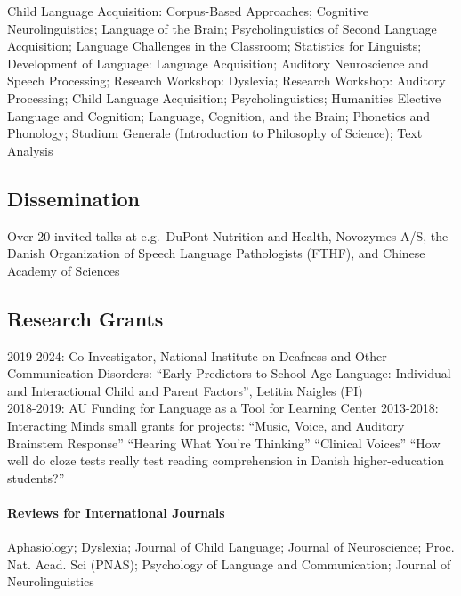 \documentclass[]{article}
\let\oldparagraph\paragraph
\renewcommand{\paragraph}[1]{\oldparagraph{#1}\mbox{}}
\begin{document}
Child Language Acquisition: Corpus-Based Approaches; Cognitive
Neurolinguistics; Language of the Brain; Psycholinguistics of Second
Language Acquisition; Language Challenges in the Classroom; Statistics
for Linguists; Development of Language: Language Acquisition; Auditory
Neuroscience and Speech Processing; Research Workshop: Dyslexia;
Research Workshop: Auditory Processing; Child Language Acquisition;
Psycholinguistics; Humanities Elective Language and Cognition; Language,
Cognition, and the Brain; Phonetics and Phonology; Studium Generale
(Introduction to Philosophy of Science); Text Analysis

\subsection{Dissemination}\label{dissemination}

Over 20 invited talks at e.g.~DuPont Nutrition and Health, Novozymes
A/S, the Danish Organization of Speech Language Pathologists (FTHF), and
Chinese Academy of Sciences

\subsection{Research Grants}\label{research-grants}

2019-2024: Co-Investigator, National Institute on Deafness and Other
Communication Disorders: ``Early Predictors to School Age Language:
Individual and Interactional Child and Parent Factors'', Letitia Naigles
(PI)\\
2018-2019: AU Funding for Language as a Tool for Learning Center
2013-2018: Interacting Minds small grants for projects: ``Music, Voice,
and Auditory Brainstem Response'' ``Hearing What You're Thinking''
``Clinical Voices'' ``How well do cloze tests really test reading
comprehension in Danish higher-education students?''

\paragraph{Reviews for International
Journals}\label{reviews-for-international-journals}

Aphasiology; Dyslexia; Journal of Child Language; Journal of
Neuroscience; Proc. Nat. Acad. Sci (PNAS); Psychology of Language and
Communication; Journal of Neurolinguistics
\end{document}

